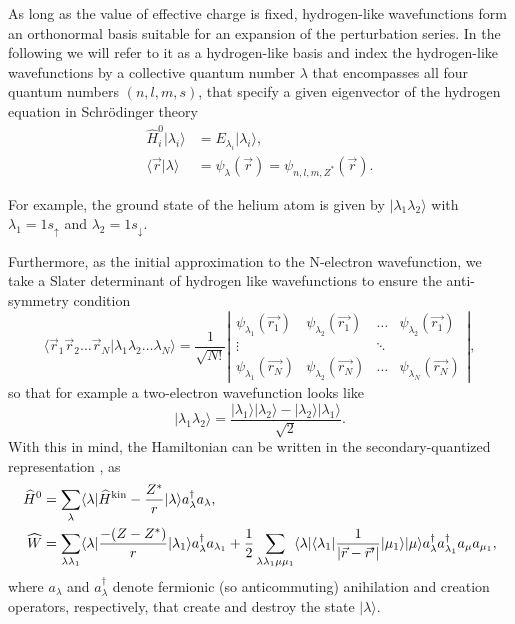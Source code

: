 As long as the value of effective charge is fixed, hydrogen-like wavefunctions form an orthonormal basis suitable for an expansion of the perturbation series. In the following we will refer to it as a hydrogen-like basis and index the hydrogen-like wavefunctions by a collective quantum number $\lambda$ that encompasses all four quantum numbers $(n,l,m,s)$, that specify a given eigenvector of the hydrogen equation in Schr\"odinger theory
\begin{align}
\widehat{H}^0_i |\lambda_i \rangle &= E_{\lambda_i}|\lambda_i \rangle, \\
\langle\vec r|\lambda \rangle &= \psi_{\lambda}(\vec{r}) = \psi_{n,l,m, Z^*}(\vec{r}).
\end{align}

For example, the ground state of
  the helium atom is given by $|\lambda_{1} \lambda_{2}\rangle$ with
  $\lambda_{1 }= 1s_{\uparrow}$ and $\lambda_{2} = 1s_{\downarrow}$.
  
Furthermore, as the initial approximation to the N-electron wavefunction, we take a Slater determinant of hydrogen like wavefunctions to ensure the anti-symmetry condition
\begin{equation} \label{effZdet}
  \langle\vec r_{1}\vec r_{2}\ldots\vec r_{N}|\lambda_1 \lambda_2 \dots \lambda_N \rangle = \frac{1}{\sqrt{N!}}
   \left| \begin{matrix} \psi_{\lambda_1}(\vec{r_1}) & \psi_{\lambda_2}(\vec{r_1}) & \dots & \psi_{\lambda_2}(\vec{r_1}) \\ 
    \vdots & & \ddots &  \\ 
    \psi_{\lambda_1}(\vec{r_N}) & \psi_{\lambda_2}(\vec{r_N})& \dots & \psi_{\lambda_N}(\vec{r_N})  \end{matrix} \right|,
\end{equation}
so that for example a two-electron wavefunction looks like
\begin{equation} \label{Exchange}
    |\lambda_{1} \lambda_{2}\rangle = \frac{|\lambda_{1} \rangle | \lambda_{2}\rangle-|\lambda_{2} \rangle | \lambda_{1}\rangle}{\sqrt{2}}.
\end{equation}
With this in mind, the Hamiltonian can be written in the secondary-quantized representation
\cite{feynman1972statistical}, as
\begin{align}
\widehat{H}^0 &= \sum_{\lambda}\langle\lambda|\widehat{H}^{\rm{kin}}-\frac{Z^{*}}{r}|\lambda\rangle a^{\dag}_{\lambda} a_{\lambda},\label{eq:5}
\\
\widehat{W}
&= \sum_{\lambda\lambda_{1}}\langle\lambda|\frac{-(Z -
	Z^{*})}{r}|\lambda_{1}\rangle  a^{\dag}_{\lambda}
a_{\lambda_{1}} +
\frac{1}{2}\sum_{\lambda\lambda_{1}\mu\mu_{1}}\langle\lambda|\langle\lambda_{1}|
\frac{1}{|\vec r - \vec r'|}|\mu_{1}\rangle|\mu\rangle 
a^{\dag}_{\lambda}  a^{\dag}_{\lambda_{1}}  a_{\mu} a_{\mu_{1}},\label{eq:6}
\end{align}
where $a_{\lambda}$ and $a^{\dag}_{\lambda}$ denote fermionic (so anticommuting) anihilation and creation operators, respectively, that create and destroy the state $|\lambda\rangle$.

